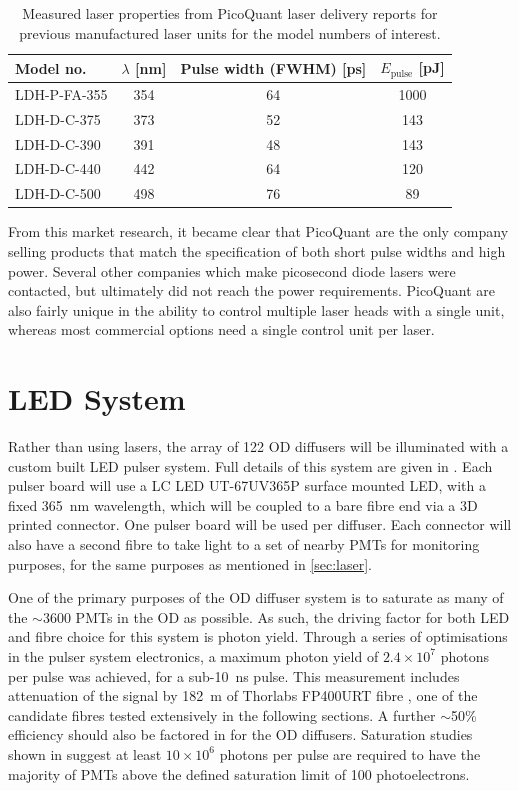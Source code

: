 \documentclass[a4paper,11pt]{article}
\let\oldsim\sim
\renewcommand{\sim}{{\oldsim}}
\begin{document}
\begin{table}
\centering
\begin{tabular}{lccc}
\toprule
Model no.	   & $\lambda$ [nm]  & Pulse width (FWHM) [ps] &  $E_\text{pulse}$ [pJ]	\\ \midrule
LDH-P-FA-355	&	354			&   64						&	1000			\\
LDH-D-C-375		&	373			&	52						&	\phantom{0}143	\\
LDH-D-C-390		&	391			&	48						&	\phantom{0}143	\\
LDH-D-C-440		&	442			&	64						&	\phantom{0}120	\\
LDH-D-C-500		&	498			&	76						&	\phantom{00}89	\\
 \bottomrule
\end{tabular}
\caption{Measured laser properties from PicoQuant laser delivery reports for previous manufactured laser units  for the model numbers of interest.}\label{tab:laserPower}
\end{table}

From this market research, it became clear that PicoQuant are the only company selling products that match the specification of both short pulse widths and high power. Several other companies which make picosecond diode lasers were contacted, but ultimately did not reach the power requirements. PicoQuant are also fairly unique in the ability to control multiple laser heads with a single unit, whereas most commercial options need a single control unit per laser.

\section{LED System}\label{sec:LED}
Rather than using lasers, the array of 122 OD diffusers will be illuminated with a custom built LED pulser system. Full details of this system are given in \cite{bib:tn0111}. Each pulser board will use a LC LED UT-67UV365P \cite{bib:LCLED} surface mounted LED, with a fixed 365~nm wavelength, which will be coupled to a bare fibre end via a 3D printed connector. One pulser board will be used per diffuser. Each connector will also have a second fibre to take light to a set of nearby PMTs for monitoring purposes, for the same purposes as mentioned in \cref{sec:laser}.

One of the primary purposes of the OD diffuser system is to saturate as many of the $\sim3600$ PMTs in the OD as possible. As such, the driving factor for both LED and fibre choice for this system is photon yield. Through a series of optimisations in the pulser system electronics, a maximum photon yield of $2.4\times10^{7}$ photons per pulse was achieved, for a sub-10~ns pulse. This measurement includes attenuation of the signal by 182~m of Thorlabs FP400URT fibre \cite{bib:fp400urt}, one of the candidate fibres tested extensively in the following sections. A further $\sim$50\% efficiency should also be factored in for the OD diffusers. Saturation studies shown in \cite{bib:tn0111} suggest at least $10\times10^6$ photons per pulse are required to have the majority of PMTs above the defined saturation limit of 100 photoelectrons.
\end{document}
